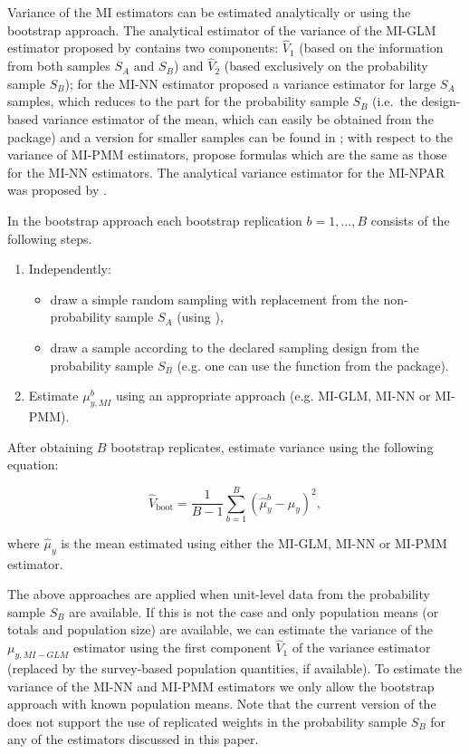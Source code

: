 \documentclass[
]{jss}
\begin{document}
Variance of the MI estimators can be estimated analytically or using the
bootstrap approach. The analytical estimator of the variance of the
MI-GLM estimator proposed by \citet[p. 950]{kim_combining_2021} contains
two components: \(\hat{V}_1\) (based on the information from both
samples \(S_A\) and \(S_B\)) and \(\hat{V}_2\) (based exclusively on the
probability sample \(S_B\)); for the MI-NN estimator
\citet{yang2021integration} proposed a variance estimator for large
\(S_A\) samples, which reduces to the part for the probability sample
\(S_B\) (i.e.~the design-based variance estimator of the mean, which can
easily be obtained from the  package) and a version for
smaller samples can be found in \citet{chlebicki2025}; with respect to
the variance of MI-PMM estimators, \citet{chlebicki2025} propose
formulas which are the same as those for the MI-NN estimators. The
analytical variance estimator for the MI-NPAR was proposed by
\citet{chen_nonparametric_2022}.

In the bootstrap approach each bootstrap replication \(b=1,...,B\)
consists of the following steps.

\begin{enumerate}
\item Independently:
  \begin{itemize}
  \item draw a simple random sampling with replacement from the non-probability sample $S_A$ (using ),
  \item draw a sample according to the declared sampling design from the probability sample $S_B$ (e.g. one can use the  function from the  package).
  \end{itemize}
\item Estimate $\mu_{y, MI}^b$ using an appropriate approach (e.g. MI-GLM, MI-NN or MI-PMM).
\end{enumerate}

After obtaining \(B\) bootstrap replicates, estimate variance using the
following equation:

\begin{equation}
\hat{V}_{\text{boot}} = \frac{1}{B-1}\sum_{b=1}^B\left(\hat{\mu}^b_y - \hat{\mu}_y\right)^2,
\label{eq-var-bootstrap}
\end{equation}

where \(\hat{\mu}_y\) is the mean estimated using either the MI-GLM,
MI-NN or MI-PMM estimator.

The above approaches are applied when unit-level data from the
probability sample \(S_B\) are available. If this is not the case and
only population means (or totals and population size) are available, we
can estimate the variance of the \(\mu_{y,MI-GLM}\) estimator using the
first component \(\hat{V}_1\) of the \citet{kim_combining_2021} variance
estimator (replaced by the survey-based population quantities, if
available). To estimate the variance of the MI-NN and MI-PMM estimators
we only allow the bootstrap approach with known population means. Note
that the current version of the  does not support the
use of replicated weights in the probability sample \(S_B\) for any of
the estimators discussed in this paper.
\end{document}

